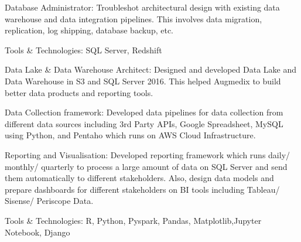 \documentclass[letterpaper]{deedy-resume} %
\begin{document}
\begin{minipage}[t]{0.66\textwidth}
\sectionspace %


\begin{tightitemize}
\sectionspace
\item Database Administrator:
Troubleshot architectural design with existing data warehouse and data integration pipelines. This involves data migration, replication, log shipping, database backup, etc.
\item Tools & Technologies: SQL Server, Redshift

\end{tightitemize}

\sectionspace %


\begin{tightitemize}
\sectionspace
\item Data Lake & Data Warehouse Architect:
Designed and developed Data Lake and Data Warehouse in S3 and SQL Server 2016. This helped Augmedix to build better data products and reporting tools.

\item Data Collection framework:
Developed data pipelines for data collection from different data sources including 3rd Party APIs, Google Spreadsheet, MySQL using Python, and Pentaho which runs on AWS Cloud Infrastructure.
\item Reporting and Visualisation:
Developed reporting framework which runs daily/ monthly/ quarterly to process a large amount of data on SQL Server and send them automatically to different stakeholders. Also, design data models and prepare dashboards for different stakeholders on BI tools including Tableau/ Sisense/ Periscope Data.
\item Tools & Technologies: R, Python, Pyspark, Pandas, Matplotlib,Jupyter Notebook, Django
\end{tightitemize}

\end{minipage} %


\end{document}
